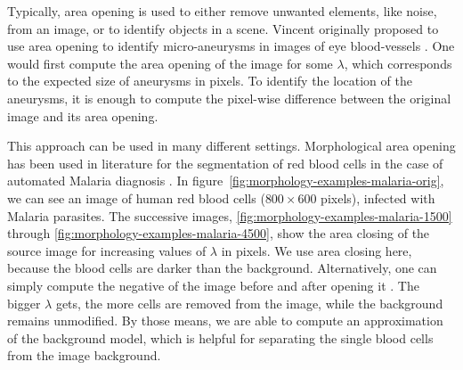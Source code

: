 Typically, area opening is used to either remove unwanted elements, like noise,
from an image, or to identify objects in a scene. Vincent originally proposed to
use area opening to identify micro-aneurysms in images of eye blood-vessels
\cite{Vincent1994Morphological}. One would first compute the area opening of the
image for some $\lambda$, which corresponds to the expected size of aneurysms in
pixels. To identify the location of the aneurysms, it is enough to compute the
pixel-wise difference between the original image and its area opening.

This approach can be used in many different settings. Morphological area opening
has been used in literature for the segmentation of red blood cells in the case
of automated Malaria diagnosis \cite{MohanaRao2001Areagranulometry,
  Tek2010Parasite}. In figure~\ref{fig:morphology-examples-malaria-orig}, we can
see an image of human red blood cells ($800 \times 600$ pixels), infected with
Malaria parasites. The successive images,
\ref{fig:morphology-examples-malaria-1500} through
\ref{fig:morphology-examples-malaria-4500}, show the area closing of the source
image for increasing values of $\lambda$ in pixels. We use area closing here,
because the blood cells are darker than the background. Alternatively, one can
simply compute the negative of the image before and after opening it
\cite{Wilkinson2000Fast}. The bigger $\lambda$ gets, the more cells are removed
from the image, while the background remains unmodified. By those means, we are
able to compute an approximation of the background model, which is helpful for
separating the single blood cells from the image background.

